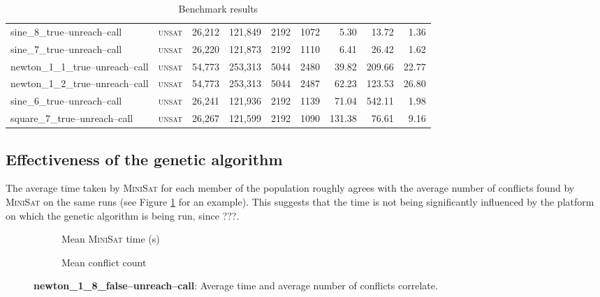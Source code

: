 \documentclass[proof,pdftex,11pt,a4,titlepage]{article}
\newcommand{\unsat}{\textsc{unsat}}
\begin{document}
\begin{table}
\begin{minipage}{\textwidth+3cm}
\begin{tabular}{|l|crr|rr|rrr|}
      sine\_8\_true--unreach--call & \unsat{} & 26,212 & 121,849 & 2192 & 1072 & 5.30 & 13.72 & 1.36 \\
      sine\_7\_true--unreach--call & \unsat{} & 26,220 & 121,873 & 2192 & 1110 & 6.41 & 26.42 & 1.62 \\
      newton\_1\_1\_true--unreach--call & \unsat{} & 54,773 & 253,313 &  5044 & 2480 & 39.82 & 209.66 & 22.77  \\
      newton\_1\_2\_true--unreach--call & \unsat{} & 54,773 & 253,313 &  5044 & 2487 & 62.23 & 123.53 & 26.80  \\
      sine\_6\_true--unreach--call & \unsat{} & 26,241 & 121,936 & 2192 & 1139 & 71.04 & 542.11 & 1.98  \\
      square\_7\_true--unreach--call & \unsat{} & 26,267 & 121,599 & 2192 & 1090 & 131.38 & 76.61 & 9.16 \\
      \hline
    \end{tabular}
    \caption{Benchmark results}
    \label{table:results}
  \end{minipage}
\end{table}

\subsection{Effectiveness of the genetic algorithm}

The average time taken by \textsc{MiniSat} for each member of the population roughly agrees with the average number of conflicts found by \textsc{MiniSat} on the same runs (see Figure \ref{fig:time-conflicts} for an example). This suggests that the time is not being significantly influenced by the platform on which the genetic algorithm is being run, since ???.

\begin{figure}[h]
  \begin{subfigure}[H]{0.5\textwidth}
    \vspace{2mm}
    
    \caption{Mean \textsc{MiniSat} time (s)}
  \end{subfigure}
  \begin{subfigure}[H]{0.5\textwidth}
    
    \caption{Mean conflict count}
  \end{subfigure}
  \caption{{\bf newton\_1\_8\_false--unreach--call}: Average time and average number of conflicts correlate.}
  \label{fig:time-conflicts}
\end{figure}
\end{document}
